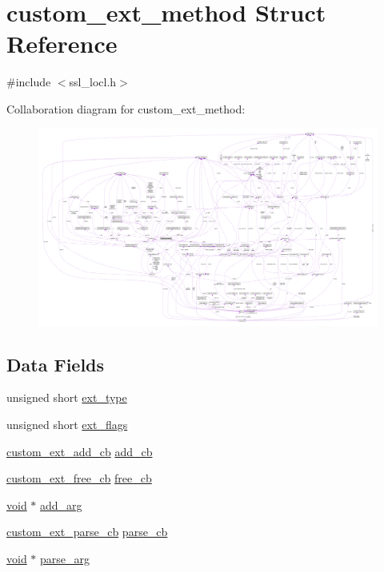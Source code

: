 \hypertarget{structcustom__ext__method}{}\section{custom\+\_\+ext\+\_\+method Struct Reference}
\label{structcustom__ext__method}


{\ttfamily \#include $<$ssl\+\_\+locl.\+h$>$}



Collaboration diagram for custom\+\_\+ext\+\_\+method\+:\nopagebreak
\begin{figure}[H]
\begin{center}
\leavevmode
\includegraphics[width=350pt]{structcustom__ext__method__coll__graph}
\end{center}
\end{figure}
\subsection*{Data Fields}
\begin{DoxyCompactItemize}
\item 
unsigned short \hyperlink{structcustom__ext__method_a831116752b7116d4db671346e0b20d76}{ext\+\_\+type}
\item 
unsigned short \hyperlink{structcustom__ext__method_a6d02348c67aa49a74ae38bac11865dc0}{ext\+\_\+flags}
\item 
\hyperlink{ssl_2ssl_8h_af1f3c4541ad82dbfdab587742a5c4286}{custom\+\_\+ext\+\_\+add\+\_\+cb} \hyperlink{structcustom__ext__method_afedf7390fec3693c001838db547cef04}{add\+\_\+cb}
\item 
\hyperlink{ssl_2ssl_8h_aa525fa644f28901990a590079bd510f7}{custom\+\_\+ext\+\_\+free\+\_\+cb} \hyperlink{structcustom__ext__method_a3e3f1026964aa708fc4538067158a285}{free\+\_\+cb}
\item 
\hyperlink{hw__4758__cca_8h_afad4d591c7931ff6dc5bf69c76c96aa0}{void} $\ast$ \hyperlink{structcustom__ext__method_ae00b644bf03a698e777c2e8ad533a8a5}{add\+\_\+arg}
\item 
\hyperlink{ssl_2ssl_8h_abba88d5c62d3282fb2a91f199e6d67c2}{custom\+\_\+ext\+\_\+parse\+\_\+cb} \hyperlink{structcustom__ext__method_aa3ec38c896a89e8222455fbd45e0f041}{parse\+\_\+cb}
\item 
\hyperlink{hw__4758__cca_8h_afad4d591c7931ff6dc5bf69c76c96aa0}{void} $\ast$ \hyperlink{structcustom__ext__method_a4e72d86fa8dc7e8ea2955cbc2a52d8f4}{parse\+\_\+arg}
\end{DoxyCompactItemize}


